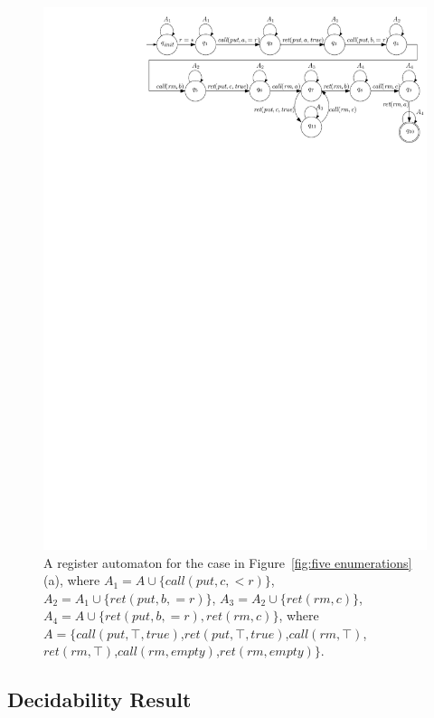 \documentclass[a4paper,UKenglish]{lipics-v2016}
\begin{document}
\begin{figure}[t]
  \centering
  \includegraphics[width=0.65 \textwidth]{PIC-WitnessAutomata-For1.pdf}
  \caption{A register automaton for the case in Figure~\ref{fig:five enumerations}(a), where $A_1 = A \cup \{ \textit{call}(\textit{put},c,<r)\}$, $A_2 = A_1 \cup \{ \textit{ret}(\textit{put},b,=r) \}$, $A_3 = A_2 \cup \{ \textit{ret}(\textit{rm},c) \}$, $A_4 = A \cup \{ \textit{ret}(\textit{put},b,=r), \textit{ret}(\textit{rm},c) \}$, where $A = \{ \textit{call}(\textit{put},\top,\textit{true})$,$\textit{ret}(\textit{put},\top,\textit{true})$,$\textit{call}(\textit{rm},\top)$,$\textit{ret}(\textit{rm},\top)$,$\textit{call}(\textit{rm},\textit{empty})$,$\textit{ret}(\textit{rm},\textit{empty})\}$.}
  \label{fig:an enumeration and its witness automaton}
\end{figure}






\subsection{Decidability Result}
\label{subsec:combine step-by-step linearizability and co-regular}
\end{document}
